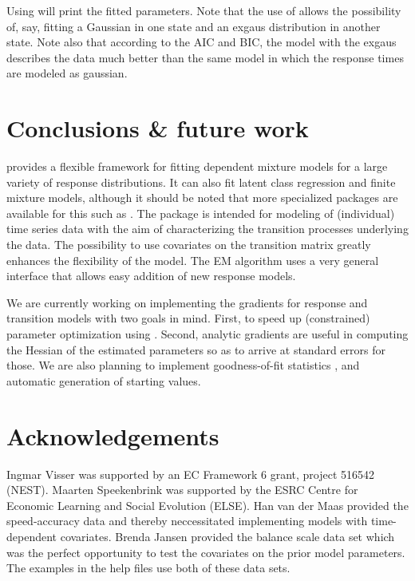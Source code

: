 \documentclass[article]{jss}
\begin{document}
Using  will print the fitted parameters.  Note that the
use of  allows the possibility of, say, fitting a
Gaussian in one state and an exgaus distribution in another state.
Note also that according to the AIC and BIC, the model with the exgaus
describes the data much better than the same model in which the
response times are modeled as gaussian.


\section[Conclusions and future work]{Conclusions \& future work}

 provides a flexible framework for fitting dependent
mixture models for a large variety of response distributions.  It can
also fit latent class regression and finite mixture models, although
it should be noted that more specialized packages are available for
this such as  \citep{Leisch2004}.  The package is
intended for modeling of (individual) time series data with the aim of
characterizing the transition processes underlying the data.  The
possibility to use covariates on the transition matrix greatly
enhances the flexibility of the model.  The EM algorithm uses a very
general interface that allows easy addition of new response models.

We are currently working on implementing the gradients for response
and transition models with two goals in mind.  First, to speed up
(constrained) parameter optimization using .  Second,
analytic gradients are useful in computing the Hessian of the
estimated parameters so as to arrive at standard errors for those.  We
are also planning to implement goodness-of-fit statistics
\citep{Titman2008}, and automatic generation of starting values.


\section*{Acknowledgements} 

Ingmar Visser was supported by an EC Framework 6 grant, project 516542
(NEST).  Maarten Speekenbrink was supported by the ESRC Centre for
Economic Learning and Social Evolution (ELSE).  Han van der Maas
provided the speed-accuracy data \cite{Dutilh2009} and thereby
neccessitated implementing models with time-dependent covariates.
Brenda Jansen provided the balance scale data set \citep{Jansen2002}
which was the perfect opportunity to test the covariates on the prior
model parameters.  The examples in the help files use both of these
data sets.



\end{document}
